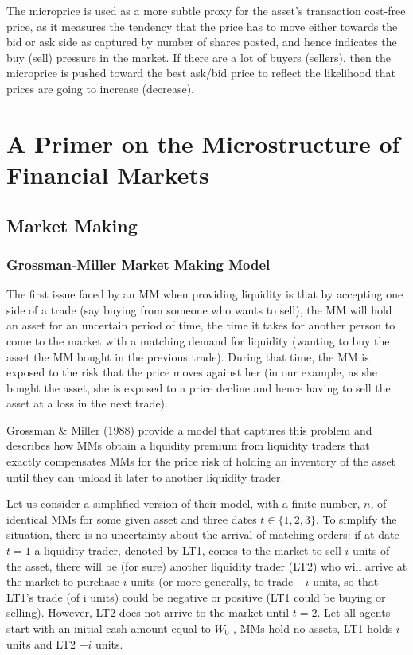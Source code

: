 \documentclass[11pt]{article}
\begin{document}
The microprice is used as a more subtle proxy for the asset's transaction cost-free price, as it
measures the tendency that the price has to move either towards the bid or ask side as captured by
number of shares posted, and hence indicates the buy (sell) pressure in the market. If there are a lot
of buyers (sellers), then the microprice is pushed toward the best ask/bid price to reflect the
likelihood that prices are going to increase (decrease).
\section{A Primer on the Microstructure of Financial Markets}
\label{sec:org80d317a}
\subsection{Market Making}
\label{sec:orgc6608d3}
\subsubsection{Grossman-Miller Market Making Model}
\label{sec:org0b7c520}
The first issue faced by an MM when providing liquidity is that by accepting one side of a trade (say
buying from someone who wants to sell), the MM will hold an asset for an uncertain period of time, the
time it takes for another person to come to the market with a matching demand for liquidity (wanting
to buy the asset the MM bought in the previous trade). During that time, the MM is exposed to the risk
that the price moves against her (in our example, as she bought the asset, she is exposed to a price
decline and hence having to sell the asset at a loss in the next trade).

Grossman \& Miller (1988) provide a model that captures this problem and describes how MMs obtain a
liquidity premium from liquidity traders that exactly compensates MMs for the price risk of holding an
inventory of the asset until they can unload it later to another liquidity trader.

Let us consider a simplified version of their model, with a finite number, \(n\), of identical MMs for
some given asset and three dates \(t\in\{1,2,3\}\). To simplify the situation, there is no uncertainty
about the arrival of matching orders: if at date \(t=1\) a liquidity trader, denoted by LT1, comes to
the market to sell \(i\) units of the asset, there will be (for sure) another liquidity trader (LT2)
who will arrive at the market to purchase \(i\) units (or more generally, to trade \(-i\) units, so
that LT1's trade (of i units) could be negative or positive (LT1 could be buying or selling). However,
LT2 does not arrive to the market until \(t=2\). Let all agents start with an initial cash amount
equal to \(W_0\) , MMs hold no assets, LT1 holds \(i\) units and LT2 \(-i\) units.
\end{document}
